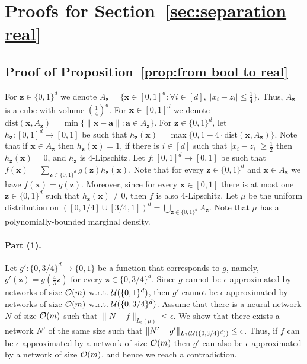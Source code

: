 \documentclass[11pt]{article}
\newcommand{\ba}{\mathbf{a}}
\newcommand{\bx}{\mathbf{x}}
\newcommand{\bz}{\mathbf{z}}
\newcommand{\co}{{\cal O}}
\newcommand{\cu}{{\cal U}}
\DeclareMathOperator*{\E}{\mathbb{E}}
\newcommand{\norm}[1]{\left\|#1\right\|}
\newcommand{\snorm}[1]{\|#1\|} %
\begin{document}
\section{Proofs for Section~\ref{sec:separation real}}

\subsection{Proof of Proposition~\ref{prop:from bool to real}}
\label{app:proof of prop from bool to real}

For $\bz \in \{0,1\}^d$ we denote $A_\bz = \{\bx \in [0,1]^d: \forall i \in [d], \; |x_i-z_i| \leq \frac{1}{4}\}$. Thus, $A_\bz$ is a cube with volume $\left(\frac{1}{4}\right)^d$. For $\bx \in [0,1]^d$ we denote $\text{dist}(\bx,A_\bz)=\min\{\norm{\bx-\ba}: \ba \in A_\bz\}$. For $\bz \in \{0,1\}^d$, let $h_\bz:[0,1]^d \rightarrow [0,1]$ be such that $h_\bz(\bx) = \max\{0, 1 - 4 \cdot \text{dist}(\bx,A_\bz)\}$. Note that if $\bx \in A_\bz$ then $h_\bz(\bx)=1$, if there is $i \in [d]$ such that $|x_i-z_i| \geq \frac{1}{2}$ then $h_\bz(\bx)=0$, and $h_\bz$ is $4$-Lipschitz. Let $f:[0,1]^d \rightarrow [0,1]$ be such that $f(\bx) = \sum_{\bz \in \{0,1\}^d}g(\bz) h_\bz(\bx)$.
Note that for every $\bz \in \{0,1\}^d$ and $\bx \in A_\bz$ we have $f(\bx) = g(\bz)$. Moreover, since for every $\bx \in [0,1]$ there is at most one $\bz \in \{0,1\}^d$ such that $h_\bz(\bx) \neq 0$, then $f$ is also $4$-Lipschitz. Let $\mu$ be the uniform distribution on $([0,1/4] \cup [3/4,1])^d = \bigcup_{\bz \in \{0,1\}^d}A_\bz$. Note that $\mu$ has a polynomially-bounded marginal density.

\paragraph{Part (1).}
Let $g':\{0,3/4\}^d \rightarrow \{0,1\}$ be a function that corresponds to $g$, namely, $g'(\bz) = g(\frac{4}{3} \bz)$ for every $\bz \in \{0,3/4\}^d$. Since $g$ cannot be $\epsilon$-approximated by networks of size $\co(m)$ w.r.t. $\cu(\{0,1\}^d)$, then $g'$ cannot be $\epsilon$-approximated by networks of size $\co(m)$ w.r.t. $\cu(\{0,3/4\}^d)$. 
Assume that there is a neural network $N$ of size $\co(m)$ such that 
$\snorm{N-f}_{L_2(\mu)} \leq \epsilon$.
We show that there exists a network $N'$ of the same size such that 
$\snorm{N'-g'}_{L_2(\cu(\{0,3/4\}^d))} \leq \epsilon$.
Thus, if $f$ can be $\epsilon$-approximated by a network of size $\co(m)$ then $g'$ can also be $\epsilon$-approximated by a network of size $\co(m)$, and hence we reach a contradiction.	
\end{document}
